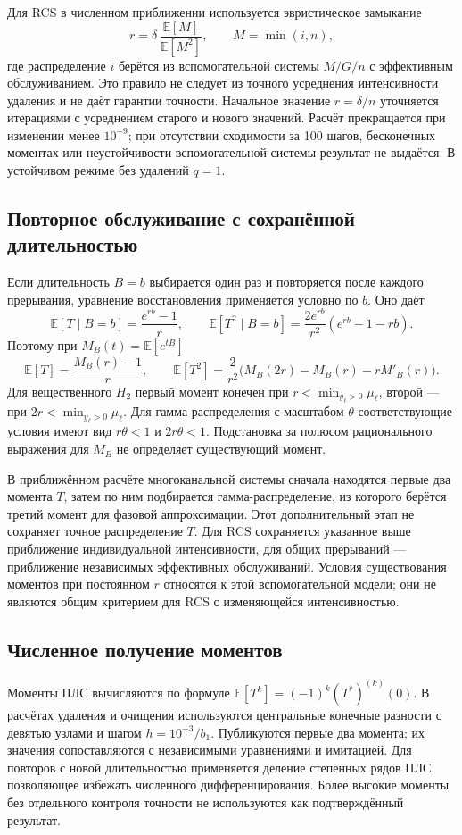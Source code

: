 \documentclass[a4paper,12pt]{article}
\begin{document}
Для RCS в численном приближении используется эвристическое замыкание
\[
r=\delta\,\frac{\mathbb E[M]}{\mathbb E[M^2]},\qquad M=\min(i,n),
\]
где распределение \(i\) берётся из вспомогательной системы \(M/G/n\) с эффективным обслуживанием. Это правило не следует из точного усреднения интенсивности удаления и не даёт гарантии точности. Начальное значение \(r=\delta/n\) уточняется итерациями с усреднением старого и нового значений. Расчёт прекращается при изменении менее \(10^{-9}\); при отсутствии сходимости за 100 шагов, бесконечных моментах или неустойчивости вспомогательной системы результат не выдаётся. В устойчивом режиме без удалений \(q=1.\)

\subsection{Повторное обслуживание с сохранённой длительностью}
Если длительность \(B=b\) выбирается один раз и повторяется после каждого прерывания, уравнение восстановления применяется условно по \(b.\) Оно даёт
\[
\mathbb E[T\mid B=b]=\frac{e^{rb}-1}{r},\qquad
\mathbb E[T^2\mid B=b]=\frac{2e^{rb}}{r^2}(e^{rb}-1-rb).
\]
Поэтому при \(M_B(t)=\mathbb E[e^{tB}]\)
\[
\mathbb E[T]=\frac{M_B(r)-1}{r},\qquad
\mathbb E[T^2]=\frac{2}{r^2}\bigl(M_B(2r)-M_B(r)-rM'_B(r)\bigr).
\]
Для вещественного \(H_2\) первый момент конечен при \(r<\min_{y_\ell>0}\mu_\ell\), второй --- при \(2r<\min_{y_\ell>0}\mu_\ell.\) Для гамма-распределения с масштабом \(\theta\) соответствующие условия имеют вид \(r\theta<1\) и \(2r\theta<1.\) Подстановка за полюсом рационального выражения для \(M_B\) не определяет существующий момент.

В приближённом расчёте многоканальной системы сначала находятся первые два момента \(T\), затем по ним подбирается гамма-распределение, из которого берётся третий момент для фазовой аппроксимации. Этот дополнительный этап не сохраняет точное распределение \(T.\) Для RCS сохраняется указанное выше приближение индивидуальной интенсивности, для общих прерываний --- приближение независимых эффективных обслуживаний. Условия существования моментов при постоянном \(r\) относятся к этой вспомогательной модели; они не являются общим критерием для RCS с изменяющейся интенсивностью.

\subsection{Численное получение моментов}
Моменты ПЛС вычисляются по формуле \(\mathbb E[T^k]=(-1)^k(T^*)^{(k)}(0).\) В расчётах удаления и очищения используются центральные конечные разности с девятью узлами и шагом \(h=10^{-3}/b_1.\) Публикуются первые два момента; их значения сопоставляются с независимыми уравнениями и имитацией. Для повторов с новой длительностью применяется деление степенных рядов ПЛС, позволяющее избежать численного дифференцирования. Более высокие моменты без отдельного контроля точности не используются как подтверждённый результат.
\end{document}
